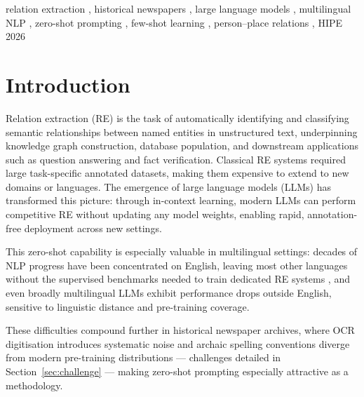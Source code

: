 \documentclass[
]{ceurart}
\theoremstyle{definition}
\begin{document}
\begin{keywords}
  relation extraction \sep
  historical newspapers \sep
  large language models \sep
  multilingual NLP \sep
  zero-shot prompting \sep
  few-shot learning \sep
  person--place relations \sep
  HIPE 2026
\end{keywords}

\maketitle

\section{Introduction}

Relation extraction (RE) is the task of automatically identifying and classifying semantic relationships between named entities in unstructured text, underpinning knowledge graph construction, database population, and downstream applications such as question answering and fact verification.
Classical RE systems required large task-specific annotated datasets, making them expensive to extend to new domains or languages.
The emergence of large language models (LLMs) has transformed this picture: through in-context learning, modern LLMs can perform competitive RE without updating any model weights, enabling rapid, annotation-free deployment across new settings.

This zero-shot capability is especially valuable in multilingual settings: decades of NLP progress have been concentrated on English, leaving most other languages without the supervised benchmarks needed to train dedicated RE systems \citep{joshi-etal-2020-state}, and even broadly multilingual LLMs exhibit performance drops outside English, sensitive to linguistic distance and pre-training coverage.

These difficulties compound further in historical newspaper archives, where OCR digitisation introduces systematic noise and archaic spelling conventions diverge from modern pre-training distributions --- challenges detailed in Section~\ref{sec:challenge} --- making zero-shot prompting especially attractive as a methodology.
\end{document}
